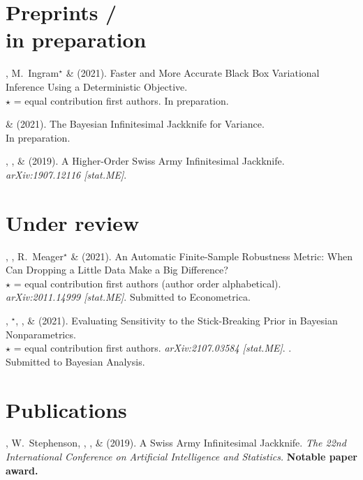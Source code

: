 \section{\sc Preprints / \\in preparation}


\mestar, M.~Ingram$^\star$ \& \tamara  (2021).
Faster and More Accurate Black Box Variational Inference Using a Deterministic Objective.\\
$\star$ = equal contribution first authors.
In preparation.

\me \& \tamara  (2021).
The Bayesian Infinitesimal Jackknife for Variance.\\
In preparation.

\me, \mike, \& \tamara (2019).
A Higher-Order Swiss Army Infinitesimal Jackknife.
\emph{arXiv:1907.12116 [stat.ME]}.

\section{\sc Under review}

\tamara, \mestar, R.~Meager$^\star$ \&  (2021).
An Automatic Finite-Sample Robustness Metric: When Can Dropping a Little Data
Make a Big Difference?\\
$\star$ = equal contribution first authors (author order alphabetical).
\emph{arXiv:2011.14999 [stat.ME]}.
Submitted to Econometrica.


\mestar, \runjing{}$^\star$, \mike, \& \tamara (2021).
Evaluating Sensitivity to the Stick-Breaking Prior in Bayesian Nonparametrics.\\
$\star$ = equal contribution first authors.
\emph{arXiv:2107.03584 [stat.ME]}.
.\\
Submitted to Bayesian Analysis.


\section{\sc Publications}

\me, W.~Stephenson, \runjing, \mike, \& \tamara (2019).  A Swiss Army Infinitesimal
Jackknife.  \emph{The 22nd International Conference on Artificial Intelligence
and Statistics.}
\textbf{Notable paper award.}

